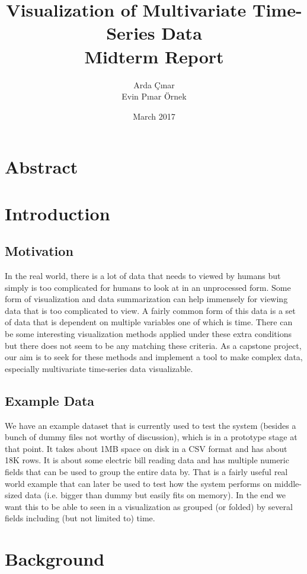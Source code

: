 \documentclass[11pt]{article}
\title{Visualization of Multivariate Time-Series Data \\ Midterm Report}
\author{Arda Çınar \\ Evin Pınar Örnek}
\date{March 2017}
\begin{document}
\maketitle

\tableofcontents

\section{Abstract} 

\section{Introduction}

\subsection{Motivation}

In the real world, there is a lot of data that needs to viewed by humans but simply is too complicated for humans to look at in an unprocessed form. Some form of visualization and data summarization can help immensely for viewing data that is too complicated to view. A fairly common form of this data is a set of data that is dependent on multiple variables one of which is time. There can be some interesting visualization methods applied under these extra conditions but there does not seem to be any matching these criteria. As a capstone project, our aim is to seek for these methods and implement a tool to make complex data, especially multivariate time-series data visualizable. 

\subsection{Example Data}
We have an example dataset that is currently used to test the system (besides a bunch of dummy files not worthy of discussion), which is in a prototype stage at that point. It takes about 1MB space on disk in a CSV format and has about 18K rows. It is about some electric bill reading data and has multiple numeric fields that can be used to group the entire data by. That is a fairly useful real world example that can later be used to test how the system performs on middle-sized data (i.e. bigger than dummy but easily fits on memory). In the end we want this to be able to seen in a visualization as grouped (or folded) by several fields including (but not limited to) time. 

\section{Background}
\end{document}
